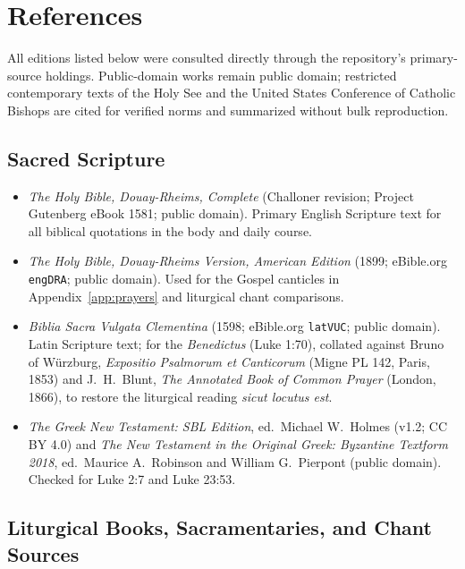 \section{References}\label{app:references}

All editions listed below were consulted directly through the repository's
primary-source holdings. Public-domain works remain public domain; restricted
contemporary texts of the Holy See and the United States Conference of Catholic
Bishops are cited for verified norms and summarized without bulk reproduction.

\subsection{Sacred Scripture}

\begin{itemize}
\item \textit{The Holy Bible, Douay-Rheims, Complete} (Challoner revision;
Project Gutenberg eBook 1581; public domain). Primary English Scripture text
for all biblical quotations in the body and daily course.
\item \textit{The Holy Bible, Douay-Rheims Version, American Edition} (1899;
eBible.org \texttt{engDRA}; public domain). Used for the Gospel canticles in
Appendix~\ref{app:prayers} and liturgical chant comparisons.
\item \textit{Biblia Sacra Vulgata Clementina} (1598; eBible.org
\texttt{latVUC}; public domain). Latin Scripture text; for the
\textit{Benedictus} (Luke 1:70), collated against Bruno of W\"urzburg,
\textit{Expositio Psalmorum et Canticorum} (Migne PL 142, Paris, 1853) and
J.~H.~Blunt, \textit{The Annotated Book of Common Prayer} (London, 1866), to
restore the liturgical reading \textit{sicut locutus est}.
\item \textit{The Greek New Testament: SBL Edition}, ed.\ Michael W.\ Holmes
(v1.2; CC BY 4.0) and \textit{The New Testament in the Original Greek:
Byzantine Textform 2018}, ed.\ Maurice A.\ Robinson and William G.\ Pierpont
(public domain). Checked for Luke 2:7 and Luke 23:53.
\end{itemize}

\subsection{Liturgical Books, Sacramentaries, and Chant Sources}

